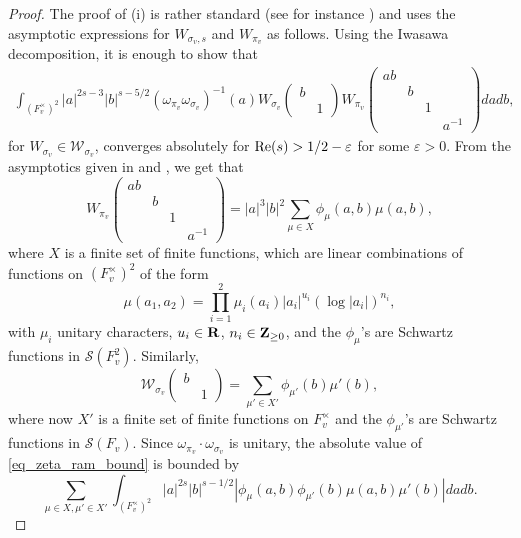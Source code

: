 \documentclass[11pt, reqno]{amsart}
\theoremstyle{plain}
\theoremstyle{definition}
\theoremstyle{remark}
\theoremstyle{plain}
\def\Z{{\bf Z}}
\def\R{{\bf R}}
\def\epsilon{\varepsilon}
\begin{document}
\begin{proof} The proof of (i) is rather standard (see for instance \cite[\S 7, Proposition 1]{JacquetShalikaExterior}) and uses the asymptotic expressions for $W_{\sigma_v,s}$ and $W_{\pi_v}$ as follows. Using the Iwasawa decomposition, it is enough to show that 
 \begin{align}\label{eq_zeta_ram_bound}\int_{(F_v^\times)^2} |a|^{2s-3}|b|^{s-5/2}(\omega_{\pi_v}\omega_{\sigma_v})^{-1}(a)W_{\sigma_v}\left(\begin{smallmatrix}
     b & \\ & 1
 \end{smallmatrix}\right)  W_{\pi_v}\left(\begin{smallmatrix}
     ab & & & \\ & b & & \\ &  & 1 & \\ & & & a^{-1} 
 \end{smallmatrix}\right)da db,\end{align}
for $W_{\sigma_v} \in \mathcal{W}_{\sigma_v}$, converges absolutely for ${\rm Re}(s) > 1/2 - \epsilon$ for some $\epsilon >0$. From the asymptotics given in \cite[Proposition 3, p. 177]{JacquetShalikaExterior} and \cite[Proposition 3.1]{FurusawaMorimoto}, we get that 
    \[W_{\pi_v}\left(\begin{smallmatrix}
     ab & & & \\ & b & & \\ &  & 1 & \\ & & & a^{-1} 
 \end{smallmatrix}\right)= |a|^3 |b|^2\sum_{\mu\in X}\phi_{\mu}(a,b)\mu(a,b),\]
    where $X$ is a finite set of finite functions, which are linear combinations of functions on $(F_v^\times)^2$ of the form 
    \[ \mu(a_1,a_2) = \prod_{i=1}^2 \mu_i(a_i)|a_i|^{u_i} (\log |a_i|)^{n_i}, \]
 with $\mu_i$ unitary characters, $u_i \in \R$, $n_i \in \Z_{\geq 0}$, and the $\phi_\mu$'s are Schwartz functions in $\mathcal{S}(F_v^2)$. Similarly,
 \[\mathcal{W}_{\sigma_v}\left(\begin{smallmatrix}
     b & \\ & 1
 \end{smallmatrix}\right)  = \sum_{\mu'\in X'}\phi_{\mu'}(b)\mu'(b),\]
where now $X'$ is a finite set of finite functions on $F_v^\times$ and the $\phi_{\mu'}$'s are Schwartz functions in $\mathcal{S}(F_v)$. Since $\omega_{\pi_v} \cdot \omega_{\sigma_v}$ is unitary, the absolute value of
\eqref{eq_zeta_ram_bound} is bounded by 
$$ \sum_{\mu\in X,\mu' \in X'} \int_{(F_v^\times)^2} |a|^{2s}|b|^{s-1/2}| \phi_\mu(a,b) \phi_{\mu'}(b) \mu(a,b)\mu'(b)|da db.$$ 

\end{proof}
\end{document}

